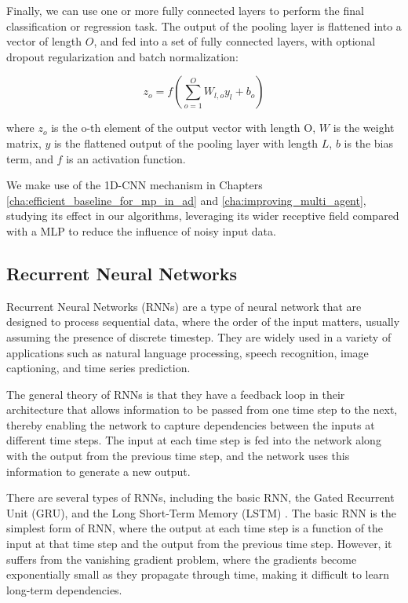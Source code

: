 Finally, we can use one or more fully connected layers to perform the final classification or regression task. The output of the pooling layer is flattened into a vector of length $O$, and fed into a set of fully connected layers, with optional dropout regularization and batch normalization:

\begin{equation}
z_o = f(\sum_{o=1}^O W_{l,o} y_l + b_o)
\end{equation}

where $z_{o}$ is the o-th element of the output vector with length O, $W$ is the weight matrix, $y$ is the flattened output of the pooling layer with length $L$, $b$ is the bias term, and $f$ is an activation function. 

We make use of the 1D-\ac{CNN} mechanism in Chapters \ref{cha:efficient_baseline_for_mp_in_ad} and \ref{cha:improving_multi_agent}, studying its effect in our algorithms, leveraging its wider receptive field compared with a \ac{MLP} to reduce the influence of noisy input data. 

\subsection{Recurrent Neural Networks}
\label{subsec:3_rnns}

Recurrent Neural Networks (RNNs) are a type of neural network that are designed to process sequential data, where the order of the input matters, usually assuming the presence of discrete timestep. They are widely used in a variety of applications such as natural language processing, speech recognition, image captioning, and time series prediction.

The general theory of RNNs is that they have a feedback loop in their architecture that allows information to be passed from one time step to the next, thereby enabling the network to capture dependencies between the inputs at different time steps. The input at each time step is fed into the network along with the output from the previous time step, and the network uses this information to generate a new output.

There are several types of RNNs, including the basic RNN, the Gated Recurrent Unit (GRU), and the Long Short-Term Memory (LSTM) \cite{hochreiter1997long}. The basic RNN is the simplest form of RNN, where the output at each time step is a function of the input at that time step and the output from the previous time step. However, it suffers from the vanishing gradient problem, where the gradients become exponentially small as they propagate through time, making it difficult to learn long-term dependencies.

